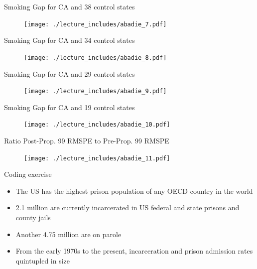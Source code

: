 \documentclass{beamer}
\begin{document}
\begin{frame}{Smoking Gap for CA and 38 control states}
	
	\begin{figure}
	\texttt{[image: ./lecture\_includes/abadie\_7.pdf]}
	\end{figure}
\end{frame}

\begin{frame}{Smoking Gap for CA and 34 control states}
	
	\begin{figure}
	\texttt{[image: ./lecture\_includes/abadie\_8.pdf]}
	\end{figure}
\end{frame}

\begin{frame}{Smoking Gap for CA and 29 control states}
	
	\begin{figure}
	\texttt{[image: ./lecture\_includes/abadie\_9.pdf]}
	\end{figure}
\end{frame}

\begin{frame}{Smoking Gap for CA and 19 control states}
	
	\begin{figure}
	\texttt{[image: ./lecture\_includes/abadie\_10.pdf]}
	\end{figure}
\end{frame}

\begin{frame}{Ratio Post-Prop. 99 RMSPE to Pre-Prop. 99 RMSPE}

	\begin{figure}
	\texttt{[image: ./lecture\_includes/abadie\_11.pdf]}
	\end{figure}
\end{frame}




\begin{frame}{Coding exercise}
	
	\begin{itemize}
	\item The US has the highest prison population of any OECD country in the world 
	\item 2.1 million are currently incarcerated in US federal and state prisons and county jails
	\item Another 4.75 million are on parole
	\item From the early 1970s to the present, incarceration and prison admission rates quintupled in size
	\end{itemize}
\end{frame}
\end{document}
